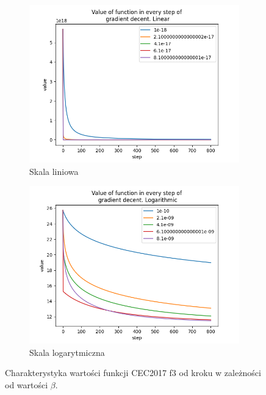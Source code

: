 \begin{figure}[h!]
\begin{subfigure}[b]{0.3\linewidth}
		\includegraphics[width=\linewidth]{photos/f2_vals_lin.png}
		\caption{Skala liniowa}
	\end{subfigure}
	\begin{subfigure}[b]{0.3\linewidth}
		\includegraphics[width=\linewidth]{photos/f3_vals_log.png}
		\caption{Skala logarytmiczna}
	\end{subfigure}
	\caption{Charakterystyka wartości funkcji CEC2017 f3 od kroku w zależności od wartości $\beta$.}
\end{figure}


